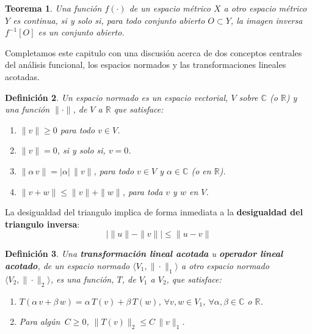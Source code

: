 \documentclass[12pt]{book}
\numberwithin{equation}{chapter}
\newtheorem{theorem}{Teorema}[chapter]
\newtheorem{definition}[theorem]{Definici\'on}
\def\n{\noindent}
\def\R{\mathbb{R}}
\def\la{\langle}
\def\ra{\rangle}
\begin{document}
\vspace{5 mm}

\begin{theorem}
Una funci\'on $f(\cdot)$ de un espacio m\'etrico $X$ a otro espacio m\'etrico $Y$ es continua, si y solo si, para todo conjunto abierto $O \subset Y$, la imagen inversa $ f^{-1}[O] $ es un conjunto abierto.
\end{theorem}

\vspace{5 mm}
 
Completamos este capitulo con una discusi\'on acerca de dos conceptos centrales del an\'alisis funcional, los espacios normados y las transformaciones lineales acotadas.

\vspace{5 mm}

\begin{definition}
Un espacio normado es un espacio vectorial, $V$ sobre $\mathbb{C}$ (o $\R$) y una funci\'on $\| \cdot \|$, de $V$ a $\R$ que satisface:
\begin{enumerate}
\item $\| v \| \geq 0$ para todo $v \in V$.
\item $\| v \|=0$, si y solo si, $v=0$.
\item $\| \alpha\, v \|=|\alpha|\, \| v \|$, para todo $v \in V$ y $\alpha \in \mathbb{C}$ (o en $\R$).
\item $\| v+w \| \leq \| v \| + \| w \|$, para toda $v$ y $w$ en $V$.
\end{enumerate}
\end{definition}

\vspace{3 mm}

\n La desigualdad del triangulo implica de forma inmediata a la {\bf desigualdad del triangulo inversa}:
$$ \Big| \|u\| - \|v\| \Big|\leq \|u-v\| $$

\begin{definition}
Una {\bf transformaci\'on lineal acotada} u {\bf operador lineal acotado}, de un espacio normado $\la V_{1},\| \cdot \|_{1} \ra$ a otro espacio normado $\la V_{2},\| \cdot \|_{2} \ra$, es una funci\'on, $T$, de $V_{1}$ a $V_{2}$, que satisface:
\begin{enumerate}
\item $T( \alpha \, v + \beta \, w )= \alpha\, T(v) + \beta \, T(w)$, $\forall v,w \in V_{1}$, $\forall \alpha,\beta \in \mathbb{C}$ o $\R$.
\item Para alg\'un $\, C \geq 0$, $\| T(v) \|_{2} \leq C\,\| v \|_{1} $.
\end{enumerate} 
\end{definition}
\end{document}
